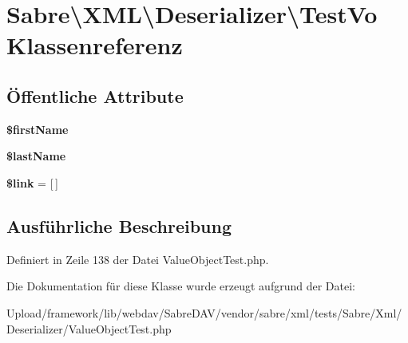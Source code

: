\hypertarget{class_sabre_1_1_x_m_l_1_1_deserializer_1_1_test_vo}{}\section{Sabre\textbackslash{}X\+ML\textbackslash{}Deserializer\textbackslash{}Test\+Vo Klassenreferenz}
\label{class_sabre_1_1_x_m_l_1_1_deserializer_1_1_test_vo}
\subsection*{Öffentliche Attribute}
\begin{DoxyCompactItemize}
\item 
\mbox{\label{class_sabre_1_1_x_m_l_1_1_deserializer_1_1_test_vo_a87f3597931279814ad9a45a48511b900}} 
{\bfseries \$first\+Name}
\item 
\mbox{\label{class_sabre_1_1_x_m_l_1_1_deserializer_1_1_test_vo_a8bcd5d730f7d2c7b0373158e842e7c0e}} 
{\bfseries \$last\+Name}
\item 
\mbox{\label{class_sabre_1_1_x_m_l_1_1_deserializer_1_1_test_vo_a7523a2be89909ba77f1b3151f5fd08e8}} 
{\bfseries \$link} = \mbox{[}$\,$\mbox{]}
\end{DoxyCompactItemize}


\subsection{Ausführliche Beschreibung}


Definiert in Zeile 138 der Datei Value\+Object\+Test.\+php.



Die Dokumentation für diese Klasse wurde erzeugt aufgrund der Datei\+:\begin{DoxyCompactItemize}
\item 
Upload/framework/lib/webdav/\+Sabre\+D\+A\+V/vendor/sabre/xml/tests/\+Sabre/\+Xml/\+Deserializer/Value\+Object\+Test.\+php\end{DoxyCompactItemize}
